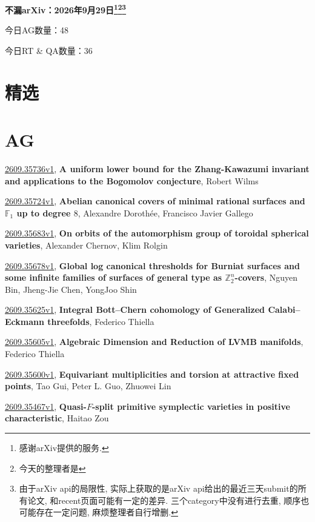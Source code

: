 \documentclass[9pt, a4paper]{article}
\theoremstyle{plain}
\theoremstyle{definition}
\theoremstyle{remark}
\newcommand{\arxiv}[3]{\href{https://arxiv.org/abs/#1}{#1}, \textbf{\textcolor{arxivblue}{#2}}, #3}
\newcommand{\AGnumber}{48}
\newcommand{\RTQAnumber}{36}
\newcommand{\NewestDate}{2026年9月29日}
\newcommand{\todayarXiver}{} %
\begin{document}
\begin{center}
    \Huge\textbf{不漏arXiv：\NewestDate\footnote{感谢arXiv提供的服务.}\footnote{今天的整理者是\todayarXiver}\footnote{由于arXiv api的局限性, 实际上获取的是arXiv api给出的最近三天submit的所有论文, 和recent页面可能有一定的差异. 三个category中没有进行去重, 顺序也可能存在一定问题, 麻烦整理者自行增删.}} \\
\end{center}

\setcounter{section}{-1}

\begin{center}
    今日AG数量：\AGnumber
    
    今日RT \& QA数量：\RTQAnumber
    
\end{center}


\section{精选}


\section{AG}
\arxiv{2609.35736v1}{A uniform lower bound for the Zhang-Kawazumi invariant and applications to the Bogomolov conjecture}{Robert Wilms}

\arxiv{2609.35724v1}{Abelian canonical covers of minimal rational surfaces and $\mathbb F_1$ up to degree $8$}{Alexandre Dorothée, Francisco Javier Gallego}

\arxiv{2609.35683v1}{On orbits of the automorphism group of toroidal spherical varieties}{Alexander Chernov, Klim Rolgin}

\arxiv{2609.35678v1}{Global log canonical thresholds for Burniat surfaces and some infinite families of surfaces of general type as $\mathbb{Z}_2^n$-covers}{Nguyen Bin, Jheng-Jie Chen, YongJoo Shin}

\arxiv{2609.35625v1}{Integral Bott--Chern cohomology of Generalized Calabi--Eckmann threefolds}{Federico Thiella}

\arxiv{2609.35605v1}{Algebraic Dimension and Reduction of LVMB manifolds}{Federico Thiella}

\arxiv{2609.35600v1}{Equivariant multiplicities and torsion at attractive fixed points}{Tao Gui, Peter L. Guo, Zhuowei Lin}

\arxiv{2609.35467v1}{Quasi-$F$-split primitive symplectic varieties in positive characteristic}{Haitao Zou}
\end{document}
